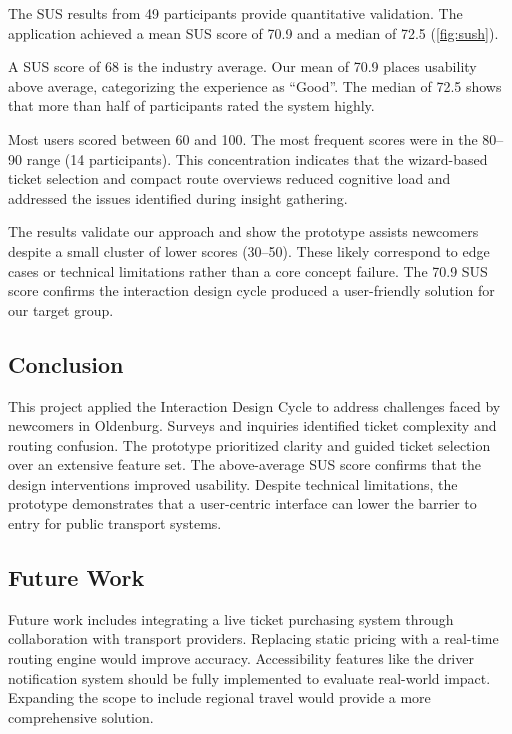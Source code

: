 \documentclass[12pt,a4paper]{article}
\begin{document}
The SUS results from 49 participants provide quantitative validation. The application achieved a mean SUS score of 70.9 and a median of 72.5 (\autoref{fig:sush}). 

A SUS score of 68 is the industry average. Our mean of 70.9 places usability above average, categorizing the experience as ``Good''. The median of 72.5 shows that more than half of participants rated the system highly. 

Most users scored between 60 and 100. The most frequent scores were in the 80--90 range (14 participants). This concentration indicates that the wizard-based ticket selection and compact route overviews reduced cognitive load and addressed the issues identified during insight gathering.

The results validate our approach and show the prototype assists newcomers despite a small cluster of lower scores (30--50). These likely correspond to edge cases or technical limitations rather than a core concept failure. The 70.9 SUS score confirms the interaction design cycle produced a user-friendly solution for our target group.

\subsection{Conclusion}
This project applied the Interaction Design Cycle to address challenges faced by newcomers in Oldenburg. Surveys and inquiries identified ticket complexity and routing confusion. The prototype prioritized clarity and guided ticket selection over an extensive feature set. The above-average SUS score confirms that the design interventions improved usability. Despite technical limitations, the prototype demonstrates that a user-centric interface can lower the barrier to entry for public transport systems.

\subsection{Future Work}
Future work includes integrating a live ticket purchasing system through collaboration with transport providers. Replacing static pricing with a real-time routing engine would improve accuracy. Accessibility features like the driver notification system should be fully implemented to evaluate real-world impact. Expanding the scope to include regional travel would provide a more comprehensive solution.



\newpage
\end{document}
